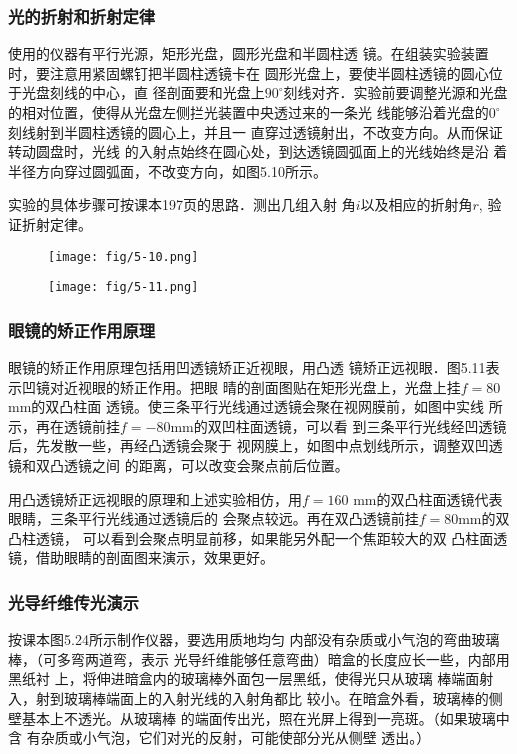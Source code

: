 \subsubsection{光的折射和折射定律}
使用的仪器有平行光源，矩形光盘，圆形光盘和半圆柱透
镜。在组装实验装置时，要注意用紧固螺钉把半圆柱透镜卡在
圆形光盘上，要使半圆柱透镜的圆心位于光盘刻线的中心，直
径剖面要和光盘上$90^{\circ}$刻线对齐．实验前要调整光源和光盘
的相对位置，使得从光盘左侧拦光装置中央透过来的一条光
线能够沿着光盘的$0^{\circ}$刻线射到半圆柱透镜的圆心上，并且一
直穿过透镜射出，不改变方向。从而保证转动圆盘时，光线
的入射点始终在圆心处，到达透镜圆弧面上的光线始终是沿
着半径方向穿过圆弧面，不改变方向，如图5.10所示。

实验的具体步骤可按课本197页的思路．测出几组入射
角$i$以及相应的折射角$r$, 验证折射定律。

\begin{figure}[htp]\centering
    \begin{minipage}[t]{0.48\textwidth}
    \centering
    \texttt{[image: fig/5-10.png]}
    \caption{}
    \end{minipage}
    \begin{minipage}[t]{0.48\textwidth}
    \centering
    \texttt{[image: fig/5-11.png]}
    \caption{}
    \end{minipage}
    \end{figure}

\subsubsection{眼镜的矫正作用原理}
眼镜的矫正作用原理包括用凹透镜矫正近视眼，用凸透
镜矫正远视眼．图5.11表示凹镜对近视眼的矫正作用。把眼
晴的剖面图贴在矩形光盘上，光盘上挂$f=80$mm的双凸柱面
透镜。使三条平行光线通过透镜会聚在视网膜前，如图中实线
所示，再在透镜前挂$f=-80$mm的双凹柱面透镜，可以看
到三条平行光线经凹透镜后，先发散一些，再经凸透镜会聚于
视网膜上，如图中点划线所示，调整双凹透镜和双凸透镜之间
的距离，可以改变会聚点前后位置。

用凸透镜矫正远视眼的原理和上述实验相仿，用$f=160$
mm的双凸柱面透镜代表眼睛，三条平行光线通过透镜后的
会聚点较远。再在双凸透镜前挂$f=80$mm的双凸柱透镜，
可以看到会聚点明显前移，如果能另外配一个焦距较大的双
凸柱面透镜，借助眼睛的剖面图来演示，效果更好。

\subsubsection{光导纤维传光演示}
按课本图5.24所示制作仪器，要选用质地均匀
内部没有杂质或小气泡的弯曲玻璃棒，（可多弯两道弯，表示
光导纤维能够任意弯曲）暗盒的长度应长一些，内部用黑纸衬
上，将伸进暗盒内的玻璃棒外面包一层黑纸，使得光只从玻璃
棒端面射入，射到玻璃棒端面上的入射光线的入射角都比
较小。在暗盒外看，玻璃棒的侧壁基本上不透光。从玻璃棒
的端面传出光，照在光屏上得到一亮斑。（如果玻璃中含
有杂质或小气泡，它们对光的反射，可能使部分光从侧壁
透出。）

